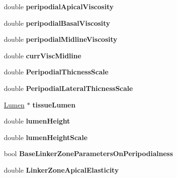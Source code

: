 \begin{DoxyCompactItemize}
\item 
\hypertarget{classSimulation_a9d12531ec1daffb9e389ac59b4f43299}{}double {\bfseries peripodial\+Apical\+Viscosity}\label{classSimulation_a9d12531ec1daffb9e389ac59b4f43299}

\item 
\hypertarget{classSimulation_aa37b9f5ae1a1711bf6905ea1525fb1f4}{}double {\bfseries peripodial\+Basal\+Viscosity}\label{classSimulation_aa37b9f5ae1a1711bf6905ea1525fb1f4}

\item 
\hypertarget{classSimulation_a92b5bdeb108bfc8816cd90eddbe49067}{}double {\bfseries peripodial\+Midline\+Viscosity}\label{classSimulation_a92b5bdeb108bfc8816cd90eddbe49067}

\item 
\hypertarget{classSimulation_adb5528b3e1aa56936966b9ebeb88ecf5}{}double {\bfseries curr\+Visc\+Midline}\label{classSimulation_adb5528b3e1aa56936966b9ebeb88ecf5}

\item 
\hypertarget{classSimulation_a1b5fd33e66ce33ae07ba854785735162}{}double {\bfseries Peripodial\+Thicness\+Scale}\label{classSimulation_a1b5fd33e66ce33ae07ba854785735162}

\item 
\hypertarget{classSimulation_a1614132f37b02b184661370a188d9b74}{}double {\bfseries Peripodial\+Lateral\+Thicness\+Scale}\label{classSimulation_a1614132f37b02b184661370a188d9b74}

\item 
\hypertarget{classSimulation_af338e9615f58802faf28c64cf6aa12d8}{}\hyperlink{classLumen}{Lumen} $\ast$ {\bfseries tissue\+Lumen}\label{classSimulation_af338e9615f58802faf28c64cf6aa12d8}

\item 
\hypertarget{classSimulation_a661531b9180d4b893f4f0221fe518b7b}{}double {\bfseries lumen\+Height}\label{classSimulation_a661531b9180d4b893f4f0221fe518b7b}

\item 
\hypertarget{classSimulation_a1a4bdb2cb7810665b95bd884dfa19adc}{}double {\bfseries lumen\+Height\+Scale}\label{classSimulation_a1a4bdb2cb7810665b95bd884dfa19adc}

\item 
\hypertarget{classSimulation_a7c6f3faf5d16e41aa43c9a71fb67d1b8}{}bool {\bfseries Base\+Linker\+Zone\+Parameters\+On\+Peripodialness}\label{classSimulation_a7c6f3faf5d16e41aa43c9a71fb67d1b8}

\item 
\hypertarget{classSimulation_aaa5d205910274dd5be4976b87ab20abc}{}double {\bfseries Linker\+Zone\+Apical\+Elasticity}\label{classSimulation_aaa5d205910274dd5be4976b87ab20abc}


\end{DoxyCompactItemize}
